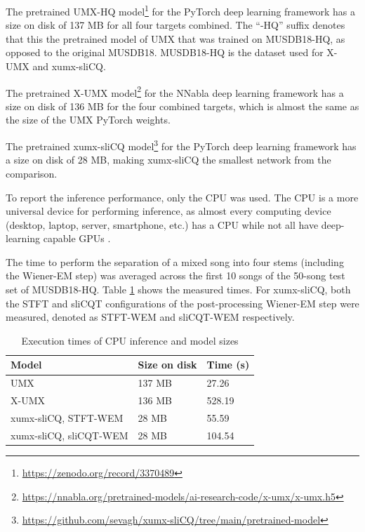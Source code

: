 \documentclass[report.tex]{subfiles}
\begin{document}
The pretrained UMX-HQ model\footnote{\url{https://zenodo.org/record/3370489}} for the PyTorch deep learning framework has a size on disk of 137 MB for all four targets combined. The ``-HQ'' suffix denotes that this the pretrained model of UMX that was trained on MUSDB18-HQ, as opposed to the original MUSDB18. MUSDB18-HQ is the dataset used for X-UMX and xumx-sliCQ.

The pretrained X-UMX model\footnote{\url{https://nnabla.org/pretrained-models/ai-research-code/x-umx/x-umx.h5}} for the NNabla deep learning framework has a size on disk of 136 MB for the four combined targets, which is almost the same as the size of the UMX PyTorch weights.

The pretrained xumx-sliCQ model\footnote{\url{https://github.com/sevagh/xumx-sliCQ/tree/main/pretrained-model}} for the PyTorch deep learning framework has a size on disk of 28 MB, making xumx-sliCQ the smallest network from the comparison.

To report the inference performance, only the CPU was used. The CPU is a more universal device for performing inference, as almost every computing device (desktop, laptop, server, smartphone, etc.) has a CPU while not all have deep-learning capable GPUs \parencite{deepcpuinf, deepcpuinf2}.

The time to perform the separation of a mixed song into four stems (including the Wiener-EM step) was averaged across the first 10 songs of the 50-song test set of MUSDB18-HQ. Table \ref{table:infperf} shows the measured times. For xumx-sliCQ, both the STFT and sliCQT configurations of the post-processing Wiener-EM step were measured, denoted as STFT-WEM and sliCQT-WEM respectively.

\begin{table}[ht]
	\centering
	\caption{Execution times of CPU inference and model sizes}
	\label{table:infperf}
	\begin{tabular}{ |l|l|l| }
	 \hline
		Model & Size on disk & Time (s) \\
	 \hline
	 \hline
		UMX & 137 MB & 27.26  \\
	 \hline
		X-UMX & 136 MB & 528.19  \\
	 \hline
		xumx-sliCQ, STFT-WEM & 28 MB & 55.59  \\
	 \hline
		xumx-sliCQ, sliCQT-WEM & 28 MB & 104.54  \\
	 \hline
\end{tabular}
\end{table}
\end{document}
